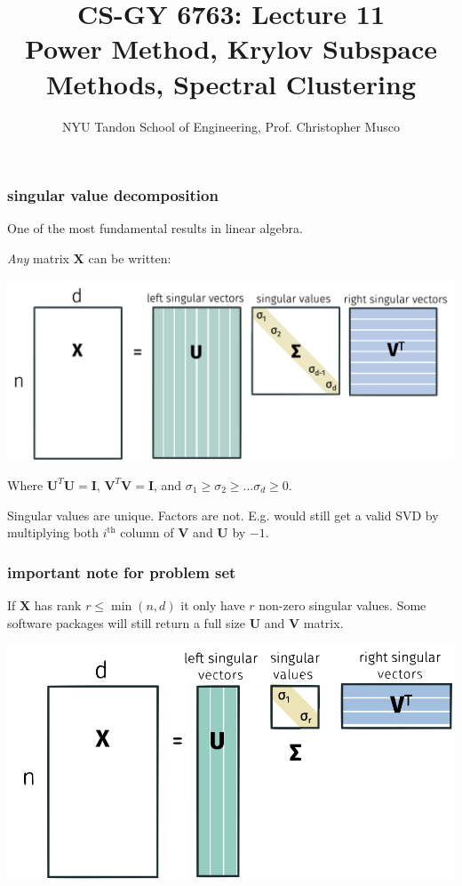 \documentclass[compress]{beamer}
\title{CS-GY 6763: Lecture 11 \\ Power Method, Krylov Subspace Methods, Spectral Clustering}
\author{NYU Tandon School of Engineering, Prof. Christopher Musco}
\date{}
\newcommand{\bv}[1]{\mathbf{#1}}
\begin{document}
\begin{frame}
	\titlepage 
\end{frame}


\begin{frame}
	\frametitle{singular value decomposition}
	\begin{center}
		\alert{One of the most fundamental results in linear algebra.}
	\end{center}
\vspace{-.5em}
	\emph{Any} matrix $\bv{X}$ can be written:
	\begin{center}
		\includegraphics[width=.9\textwidth]{svd.png}
	\end{center} 
	Where $\bv{U}^T\bv{U} = \bv{I}$,  $\bv{V}^T\bv{V} = \bv{I}$, and $\sigma_1 \geq \sigma_2 \geq \ldots \sigma_d \geq 0$. 
	
Singular values are unique. Factors are not. E.g. would still get a valid SVD by multiplying both $i^\text{th}$ column of $\bv{V}$ and $\bv{U}$ by $-1$.
\end{frame}

\begin{frame}[t]
	\frametitle{important note for problem set}
	If $\bv{X}$ has rank $r \leq \min(n,d)$ it only have $r$ non-zero singular values. Some software packages will still return a full size $\bv{U}$ and $\bv{V}$ matrix. 
\vspace{-.5em}
	\begin{center}
		\includegraphics[width=.9\textwidth]{low_rank_a.png}
	\end{center} 
\end{frame}
\end{document}
